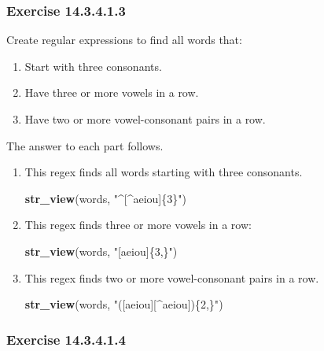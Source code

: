 \documentclass[]{book}
\newenvironment{Shaded}{\begin{snugshade}}{\end{snugshade}}
\newcommand{\KeywordTok}[1]{\textcolor[rgb]{0.13,0.29,0.53}{\textbf{#1}}}
\newcommand{\NormalTok}[1]{#1}
\newcommand{\StringTok}[1]{\textcolor[rgb]{0.31,0.60,0.02}{#1}}
\providecommand{\tightlist}{%
  \setlength{\itemsep}{0pt}\setlength{\parskip}{0pt}}
\theoremstyle{plain}
\theoremstyle{remark}
\begin{document}
\hypertarget{exercise-14.3.4.1.3}{%
\subsubsection*{\texorpdfstring{Exercise
{14.3.4.1.3}}{Exercise 14.3.4.1.3}}\label{exercise-14.3.4.1.3}}

Create regular expressions to find all words that:

\begin{enumerate}
\def\labelenumi{\arabic{enumi}.}
\tightlist
\item
  Start with three consonants.
\item
  Have three or more vowels in a row.
\item
  Have two or more vowel-consonant pairs in a row.
\end{enumerate}

The answer to each part follows.

\begin{enumerate}
\def\labelenumi{\arabic{enumi}.}
\item
  This regex finds all words starting with three consonants.

\begin{Shaded}
\begin{Highlighting}[]
\KeywordTok{str_view}\NormalTok{(words, }\StringTok{"^[^aeiou]\{3\}"}\NormalTok{)}
\end{Highlighting}
\end{Shaded}
\item
  This regex finds three or more vowels in a row:

\begin{Shaded}
\begin{Highlighting}[]
\KeywordTok{str_view}\NormalTok{(words, }\StringTok{"[aeiou]\{3,\}"}\NormalTok{)}
\end{Highlighting}
\end{Shaded}
\item
  This regex finds two or more vowel-consonant pairs in a row.

\begin{Shaded}
\begin{Highlighting}[]
\KeywordTok{str_view}\NormalTok{(words, }\StringTok{"([aeiou][^aeiou])\{2,\}"}\NormalTok{)}
\end{Highlighting}
\end{Shaded}
\end{enumerate}

\hypertarget{exercise-14.3.4.1.4}{%
\subsubsection*{\texorpdfstring{Exercise
{14.3.4.1.4}}{Exercise 14.3.4.1.4}}\label{exercise-14.3.4.1.4}}
\end{document}
